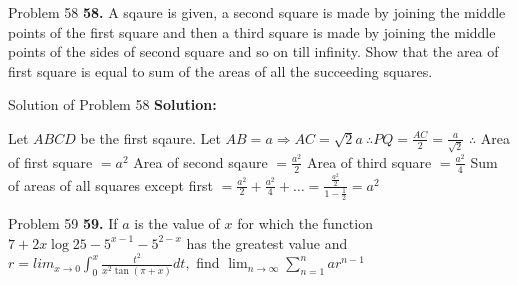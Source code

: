 \documentclass[aspectratio=1610,8pt]{beamer}
\begin{document}
\begin{frame}{Problem 58}
  \textbf{58.} A sqaure is given, a second square is made by joining the middle points of the first square and then a third square
  is made by joining the middle points of the sides of second square and so on till infinity. Show that the area of first square is
  equal to sum of the areas of all the succeeding squares.
\end{frame}
\begin{frame}{Solution of Problem 58}
  \textbf{Solution:}
  \begin{center}
  \end{center}
  Let $ABCD$ be the first sqaure. Let $AB = a \Rightarrow AC = \sqrt{2}a~\therefore PQ = \frac{AC}{2} = \frac{a}{\sqrt{2}}$
  \linebreak\linebreak
  $\therefore $ Area of first square $= a^2$
  \linebreak\linebreak
  Area of second sqaure $= \frac{a^2}{2}$
  \linebreak\linebreak
  Area of third square $= \frac{a^2}{4}$
  \linebreak\linebreak
  Sum of areas of all squares except first $= \frac{a^2}{2} + \frac{a^2}{4} + \ldots = \frac{\frac{a^2}{2}}{1 - \frac{1}{2}} = a^2$
\end{frame}
\begin{frame}{Problem 59}
  \textbf{59.} If $a$ is the value of $x$ for which the function $7 + 2x\log 25 - 5^{x - 1} - 5^{2 - x}$ has the greatest value and
  $r = lim_{x\to 0}\int_{0}^x\frac{t^2}{x^2\tan(\pi + x)}dt,$ find $\lim_{n \to \infty}\sum_{n = 1}^nar^{n - 1}$
\end{frame}
\end{document}
